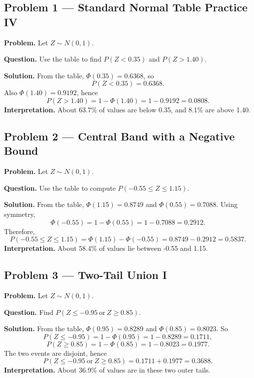 \begin{ExamProblems}

\item
\subsection*{Problem 1 --- Standard Normal Table Practice IV}

\textbf{Problem.}
Let \(Z\sim N(0,1)\).

\textbf{Question.} Use the table to find \(P(Z<0.35)\) and \(P(Z>1.40)\).

\textbf{Solution.}
From the table, \(\Phi(0.35)=0.6368\), so
\[
P(Z<0.35)=0.6368.
\]
Also \(\Phi(1.40)=0.9192\), hence
\[
P(Z>1.40)=1-\Phi(1.40)=1-0.9192=0.0808.
\]
\textbf{Interpretation.} About 63.7\% of values are below 0.35, and 8.1\% are above 1.40.


\item
\subsection*{Problem 2 --- Central Band with a Negative Bound}

\textbf{Problem.}
Let \(Z\sim N(0,1)\).

\textbf{Question.} Use the table to compute \(P(-0.55\le Z\le 1.15)\).

\textbf{Solution.}
From the table, \(\Phi(1.15)=0.8749\) and \(\Phi(0.55)=0.7088\).
Using symmetry,
\[
\Phi(-0.55)=1-\Phi(0.55)=1-0.7088=0.2912.
\]
Therefore,
\[
P(-0.55\le Z\le 1.15)=\Phi(1.15)-\Phi(-0.55)=0.8749-0.2912=0.5837.
\]
\textbf{Interpretation.} About 58.4\% of values lie between -0.55 and 1.15.


\item
\subsection*{Problem 3 --- Two-Tail Union I}

\textbf{Problem.}
Let \(Z\sim N(0,1)\).

\textbf{Question.} Find \(P(Z\le -0.95\ \text{or}\ Z\ge 0.85)\).

\textbf{Solution.}
From the table, \(\Phi(0.95)=0.8289\) and \(\Phi(0.85)=0.8023\).
So
\[
P(Z\le -0.95)=1-\Phi(0.95)=1-0.8289=0.1711,
\]
\[
P(Z\ge 0.85)=1-\Phi(0.85)=1-0.8023=0.1977.
\]
The two events are disjoint, hence
\[
P(Z\le -0.95\ \text{or}\ Z\ge 0.85)=0.1711+0.1977=0.3688.
\]
\textbf{Interpretation.} About 36.9\% of values are in these two outer tails.


\end{ExamProblems}
